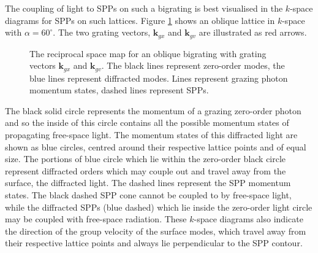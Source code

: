 The coupling of light to SPPs on such a bigrating is best visualised in the $k$-space diagrams for SPPs on such lattices. Figure \ref{fig:bigratinglattice} shows an oblique lattice in $k$-space with $\alpha=60^\circ$. The two grating vectors, $\mathbf{k}_{gx}$ and $\mathbf{k}_{gv}$ are illustrated as red arrows.
\begin{figure}
\begin{center}

\caption[The reciprocal space map for an oblique bigrating with grating vectors $\mathbf{k}_{gx}$ and $\mathbf{k}_{gv}$.]{The reciprocal space map for an oblique bigrating with grating vectors $\mathbf{k}_{gx}$ and $\mathbf{k}_{gv}$. The black lines represent zero-order modes, the blue lines represent diffracted modes. Lines represent grazing photon momentum states, dashed lines represent SPPs.\label{fig:bigratinglattice}}
\end{center}
\end{figure}
The black solid circle represents the momentum of a grazing zero-order photon and so the inside of this circle contains all the possible momentum states of propagating free-space light. The momentum states of this diffracted light are shown as blue circles, centred around their respective lattice points and of equal size. The portions of blue circle which lie within the zero-order black circle represent diffracted orders which may couple out and travel away from the surface, the diffracted light. The dashed lines represent the SPP momentum states. The black dashed SPP cone cannot be coupled to by free-space light, while the diffracted SPPs (blue dashed) which lie inside the zero-order light circle may be coupled with free-space radiation. These $k$-space diagrams also indicate the direction of the group velocity of the surface modes, which travel away from their respective lattice points and always lie perpendicular to the SPP contour.

